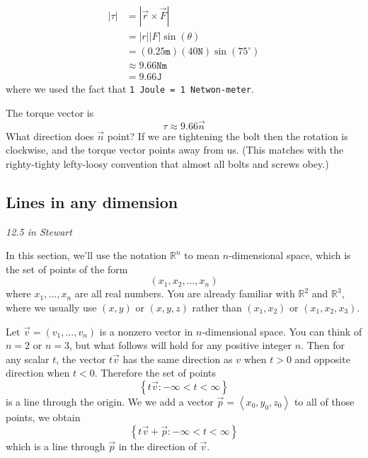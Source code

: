 \documentclass[10pt]{article}
\theoremstyle{definition}
\newcommand{\1}[1]{\textbf{1}_{\left[#1\right]}} %
\def\R{\mathbb{R}} %
\begin{document}
\begin{align*}
  |\tau|
  &= |\vec{r}\times \vec{F}|\\
  &=|r| |F| \sin(\theta)\\
  &= (0.25 \mathtt{m})(40 \mathtt{N})\sin(75^{\circ})\\ 
  &\approx 9.66 \mathtt{Nm}\\
  &=9.66 \mathtt{J}
\end{align*}
where we used the fact that \texttt{1 Joule = 1 Netwon-meter}.

The torque vector is
\begin{equation*}
  \tau\approx  9.66 \vec{n}
\end{equation*}
What direction does $\vec{n}$ point? If we are tightening the bolt then the
rotation is clockwise, and the torque vector points away from us. (This matches
with the righty-tighty lefty-loosy convention that almost all bolts and screws
obey.)



\subsection{Lines in any dimension}
\textit{12.5 in Stewart}


In this section, we'll use the notation $\R^{n}$ to mean $n$-dimensional space,
which is the set of points of the form
\begin{equation*}
  (x_{1},x_{2},\ldots,x_{n})
\end{equation*}
where $x_{1},\ldots,x_{n}$ are all real numbers. You are already familiar with
$\R^{2}$ and $\R^{3}$, where we usually use $(x,y)$ or $(x,y,z)$ rather than
$(x_{1},x_{2})$ or $(x_{1},x_{2},x_{3})$.

Let $\vec{v}=(v_{1},\ldots,v_{n})$ is a nonzero vector in $n$-dimensional space.
You can think of $n=2$ or $n=3$, but what follows will hold for any positive
integer $n$. Then for any scalar $t$, the vector $t\vec{v}$ has the same
direction as $v$ when $t>0$ and opposite direction when $t<0$. Therefore the set
of points
\begin{equation*}
  \left\{t\vec{v}: -\infty<t<\infty\right\}
\end{equation*}
is a line through the origin. We we add a vector $\vec{p}=\left\langle
  x_{0},y_{0},z_{0} \right\rangle $ to all of those points, we obtain
\begin{equation*}
  \left\{t\vec{v}+ \vec{p}: -\infty<t<\infty\right\}
\end{equation*}
which is a line through $\vec{p}$ in the direction of $\vec{v}$. 
\end{document}
